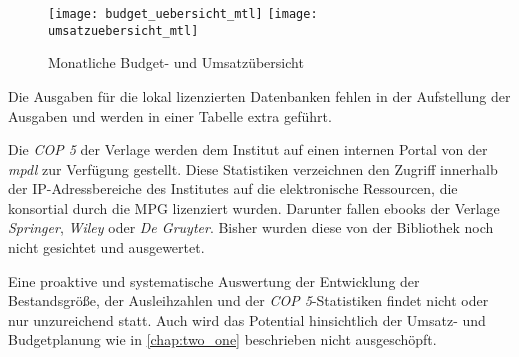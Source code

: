 \begin{figure}[h]
    \centering
        \texttt{[image: budget\_uebersicht\_mtl]}
        \texttt{[image: umsatzuebersicht\_mtl]}
        \caption{Monatliche Budget- und Umsatzübersicht}
        \label{fig:budget- und umsatzuebersicht}
\end{figure}

Die Ausgaben für die lokal lizenzierten Datenbanken fehlen in der Aufstellung der Ausgaben und werden in einer Tabelle extra geführt.

Die \textit{\acrfull{COP 5}} der Verlage werden dem Institut auf einen internen Portal von der \textit{\acrshort{mpdl}} zur Verfügung gestellt.
Diese Statistiken verzeichnen den Zugriff innerhalb der IP-Adressbereiche des Institutes auf die elektronische Ressourcen, 
die konsortial durch die \acrshort{MPG} lizenziert wurden. Darunter fallen ebooks der Verlage 
\textit{Springer}, \textit{Wiley} oder \textit{De Gruyter}. Bisher wurden diese von der Bibliothek noch nicht gesichtet und ausgewertet.

Eine proaktive und systematische Auswertung der Entwicklung der Bestandsgröße, der Ausleihzahlen und der \textit{\acrshort{COP 5}}-Statistiken findet nicht
oder nur unzureichend statt. Auch wird das Potential hinsichtlich der Umsatz- und Budgetplanung wie in \autoref{chap:two_one} beschrieben
nicht ausgeschöpft.


